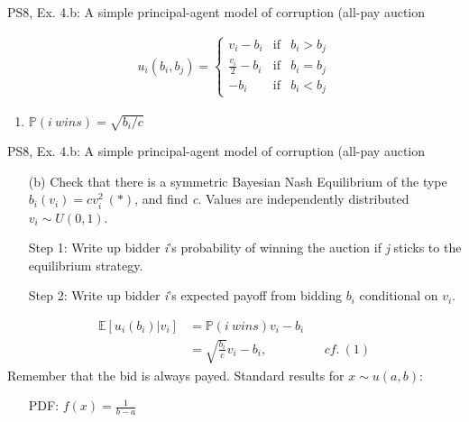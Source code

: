 \begin{frame}{PS8, Ex. 4.b: A simple principal-agent model of corruption (all-pay auction}
\begin{multicols}{2}
\begin{align*}
        u_i(b_i,b_j)=\left\{\begin{array}{lcl}
          v_i-b_i           & \text{if} & b_i>b_j \\
          \frac{v_i}{2}-b_i & \text{if} & b_i=b_j \\
          -b_i              & \text{if} & b_i<b_j
        \end{array}\right.
      \end{align*} \vspace{-16pt}
      \begin{enumerate}
        \item $\mathbb{P}(i\ wins)=\sqrt{b_i/c}$
      \end{enumerate}
      \vfill\null
    \end{multicols}
\end{frame}
\begin{frame}{PS8, Ex. 4.b: A simple principal-agent model of corruption (all-pay auction}
    \begin{itemize}
      \item[(b)] Check that there is a symmetric Bayesian Nash Equilibrium of the type $b_i(v_i) = cv_i^2\ (*)$, and find \textit{c}. Values are independently distributed $v_i\sim U(0, 1)$.
    \end{itemize} \vspace{-8pt}
    \begin{multicols}{2}
      \begin{itemize}
        \item[Step 1:] Write up bidder \textit{i}'s probability of winning the auction if \textit{j} sticks to the equilibrium strategy.
        \item[Step 2:] Write up bidder \textit{i}'s expected payoff from bidding $b_i$ conditional on $v_i$.
      \end{itemize} \vspace{-8pt}
      \begin{align*}
        \mathbb{E}[u_i(b_i)|v_i]&=\mathbb{P}(i\ wins)v_i-b_i\\
                           &=\sqrt{\frac{b_i}{c}}v_i-b_i,&&cf.\ (1)
      \end{align*} \vspace{-8pt}
      Remember that the bid is always payed.
      \vfill\null\columnbreak
      Standard results for $x\sim u(a, b):$ \vspace{-6pt}
      \begin{itemize}
        \item[PDF:] $f(x)=\frac{1}{b-a}$

\end{itemize}
\end{multicols}
\end{frame}

